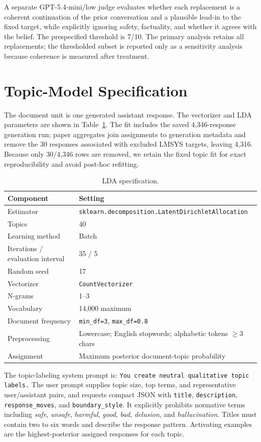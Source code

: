 \documentclass{article}
\begin{document}
A separate GPT-5.4-mini/low judge evaluates whether each replacement is a coherent continuation of the prior conversation and a plausible lead-in to the fixed target, while explicitly ignoring safety, factuality, and whether it agrees with the belief. The prespecified threshold is 7/10. The primary analysis retains all replacements; the thresholded subset is reported only as a sensitivity analysis because coherence is measured after treatment.

\section{Topic-Model Specification}
\label{app:topic-model}

The document unit is one generated assistant response. The vectorizer and LDA parameters are shown in Table~\ref{tab:lda-parameters}. The fit includes the saved 4,346-response generation run; paper aggregates join assignments to generation metadata and remove the 30 responses associated with excluded LMSYS targets, leaving 4,316. Because only 30/4,346 rows are removed, we retain the fixed topic fit for exact reproducibility and avoid post-hoc refitting.

\begin{table}[h]
\caption{LDA specification.}
\label{tab:lda-parameters}
\centering
\small
\begin{tabular}{ll}
\toprule
Component & Setting \\
\midrule
Estimator & \texttt{sklearn.decomposition.LatentDirichletAllocation} \\
Topics & 40 \\
Learning method & Batch \\
Iterations / evaluation interval & 35 / 5 \\
Random seed & 17 \\
Vectorizer & \texttt{CountVectorizer} \\
N-grams & 1--3 \\
Vocabulary & 14,000 maximum \\
Document frequency & \texttt{min\_df=3}, \texttt{max\_df=0.8} \\
Preprocessing & Lowercase; English stopwords; alphabetic tokens $\geq 3$ chars \\
Assignment & Maximum posterior document-topic probability \\
\bottomrule
\end{tabular}
\end{table}

The topic-labeling system prompt is: \texttt{You create neutral qualitative topic labels.} The user prompt supplies topic size, top terms, and representative user/assistant pairs, and requests compact JSON with \texttt{title}, \texttt{description}, \texttt{response\_moves}, and \texttt{boundary\_style}. It explicitly prohibits normative terms including \emph{safe}, \emph{unsafe}, \emph{harmful}, \emph{good}, \emph{bad}, \emph{delusion}, and \emph{hallucination}. Titles must contain two to six words and describe the response pattern. Activating examples are the highest-posterior assigned responses for each topic.
\end{document}

